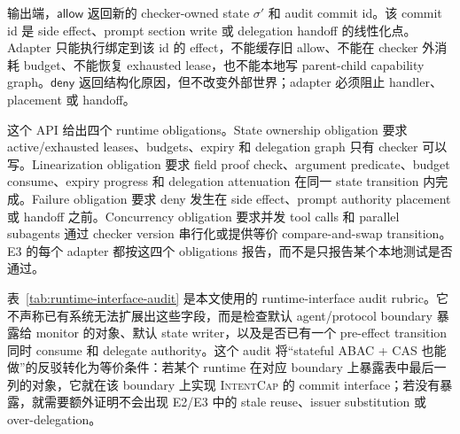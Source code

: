 \documentclass[UTF8,a4paper,11pt]{ctexart}
\newcommand{\sys}{\textsc{IntentCap}\xspace}
\begin{document}
输出端，\(\mathsf{allow}\) 返回新的 checker-owned state \(\sigma'\) 和 audit commit id。该 commit id 是 side effect、prompt section write 或 delegation handoff 的线性化点。Adapter 只能执行绑定到该 id 的 effect，不能缓存旧 allow、不能在 checker 外消耗 budget、不能恢复 exhausted lease，也不能本地写 parent-child capability graph。\(\mathsf{deny}\) 返回结构化原因，但不改变外部世界；adapter 必须阻止 handler、placement 或 handoff。

这个 API 给出四个 runtime obligations。State ownership obligation 要求 active/exhausted leases、budgets、expiry 和 delegation graph 只有 checker 可以写。Linearization obligation 要求 field proof check、argument predicate、budget consume、expiry progress 和 delegation attenuation 在同一 state transition 内完成。Failure obligation 要求 deny 发生在 side effect、prompt authority placement 或 handoff 之前。Concurrency obligation 要求并发 tool calls 和 parallel subagents 通过 checker version 串行化或提供等价 compare-and-swap transition。E3 的每个 adapter 都按这四个 obligations 报告，而不是只报告某个本地测试是否通过。

表~\ref{tab:runtime-interface-audit} 是本文使用的 runtime-interface audit rubric。它不声称已有系统无法扩展出这些字段，而是检查默认 agent/protocol boundary 暴露给 monitor 的对象、默认 state writer，以及是否已有一个 pre-effect transition 同时 consume 和 delegate authority。这个 audit 将“stateful ABAC + CAS 也能做”的反驳转化为等价条件：若某个 runtime 在对应 boundary 上暴露表中最后一列的对象，它就在该 boundary 上实现 \sys 的 commit interface；若没有暴露，就需要额外证明不会出现 E2/E3 中的 stale reuse、issuer substitution 或 over-delegation。
\end{document}
